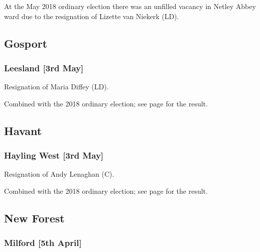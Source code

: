 \documentclass[a4paper,openany]{book}
\begin{document}
\begin{resultsiii}
At the May 2018 ordinary election there was an unfilled vacancy in Netley Abbey ward due to the resignation of Lizette van Niekerk (LD).

\subsection*{Gosport}

\subsubsection*{Leesland \hspace*{\fill}\nolinebreak[1]%
\enspace\hspace*{\fill}
[3rd May]}


Resignation of Maria Diffey (LD).

Combined with the 2018 ordinary election; see page \pageref{LeeslandGosport} for the result.

\subsection*{Havant}

\subsubsection*{Hayling West \hspace*{\fill}\nolinebreak[1]%
\enspace\hspace*{\fill}
[3rd May]}


Resignation of Andy Lenaghan (C).

Combined with the 2018 ordinary election; see page \pageref{HaylingWestHavant} for the result.

\subsection*{New Forest}

\subsubsection*{Milford \hspace*{\fill}\nolinebreak[1]%
\enspace\hspace*{\fill}
[5th April]}


\end{resultsiii}
\end{document}

